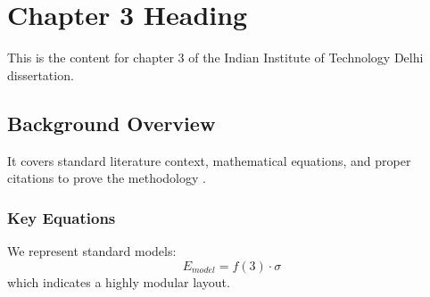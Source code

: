 \chapter{Chapter 3 Heading}
\label{ch:chapter3}
This is the content for chapter 3 of the Indian Institute of Technology Delhi dissertation.

\section{Background Overview}
It covers standard literature context, mathematical equations, and proper citations to prove the methodology \cite{texbook}.

\subsection{Key Equations}
We represent standard models:
\begin{equation}
    E_{model} = f(3) \cdot \sigma
\end{equation}
which indicates a highly modular layout.
